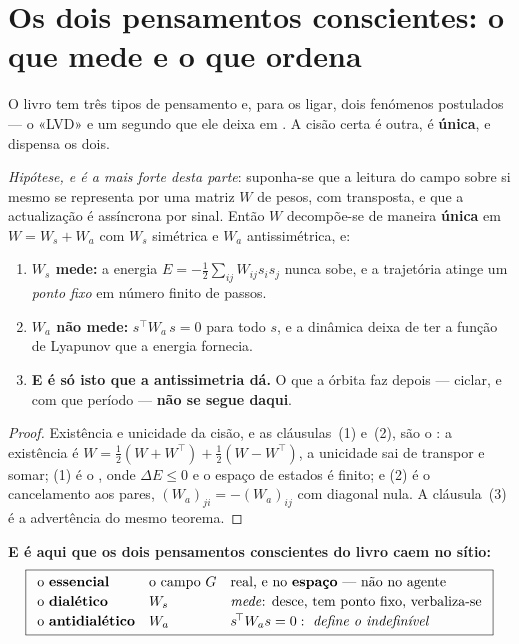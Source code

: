\documentclass[../livro.tex]{subfiles}
\begin{document}
\section{Os dois pensamentos conscientes: o que mede e o que ordena}\label{mf:conscientes}

\noindent O livro tem três tipos de pensamento e, para os ligar, dois fenómenos
postulados --- o «LVD» e um segundo que ele deixa em . A
cisão certa é outra, é \textbf{única}, e dispensa os dois.

\begin{teorema}\label{mf:thm:duas}
\emph{Hipótese, e é a mais forte desta parte}: suponha-se que a leitura do campo
sobre si mesmo se representa por uma matriz $W$ de pesos, com transposta, e que
a actualização é assíncrona por sinal. Então $W$ decompõe-se de maneira
\textbf{única} em $W=W_s+W_a$ com $W_s$ simétrica e $W_a$ antissimétrica, e:
\begin{enumerate}\itemsep3pt
\item[(1)] \textbf{$W_s$ mede:} a energia $E=-\tfrac12\sum_{ij}W_{ij}s_is_j$
nunca sobe, e a trajetória atinge um \emph{ponto fixo} em número finito de
passos.
\item[(2)] \textbf{$W_a$ não mede:} $s^{\!\top}W_a\,s=0$ para todo $s$, e a
dinâmica deixa de ter a função de Lyapunov que a energia fornecia.
\item[(3)] \textbf{E é só isto que a antissimetria dá.} O que a órbita faz depois
--- ciclar, e com que período --- \textbf{não se segue daqui}.
\end{enumerate}
\end{teorema}

\begin{proof}
Existência e unicidade da cisão, e as cláusulas~(1) e~(2), são o
: a existência é
$W=\tfrac12(W+W^{\!\top})+\tfrac12(W-W^{\!\top})$, a unicidade sai de transpor e
somar; (1) é o ,
onde $\Delta E\le0$ e o espaço de estados é finito; e (2) é o cancelamento aos
pares, $(W_a)_{ji}=-(W_a)_{ij}$ com diagonal nula. A cláusula~(3) é a
advertência do mesmo teorema.
\end{proof}

\medskip\noindent\textbf{E é aqui que os dois pensamentos conscientes do livro
caem no sítio:}
\[
\boxed{
\begin{array}{lll}
\text{o \textbf{essencial}} & \text{o campo }G & \text{real, e no \textbf{espaço} --- não no agente}\\[2pt]
\text{o \textbf{dialético}} & W_s & \text{\emph{mede}: desce, tem ponto fixo, verbaliza-se}\\[2pt]
\text{o \textbf{antidialético}} & W_a & s^{\!\top}W_as=0:\ \text{\emph{define o indefinível}}
\end{array}}
\]
\end{document}
